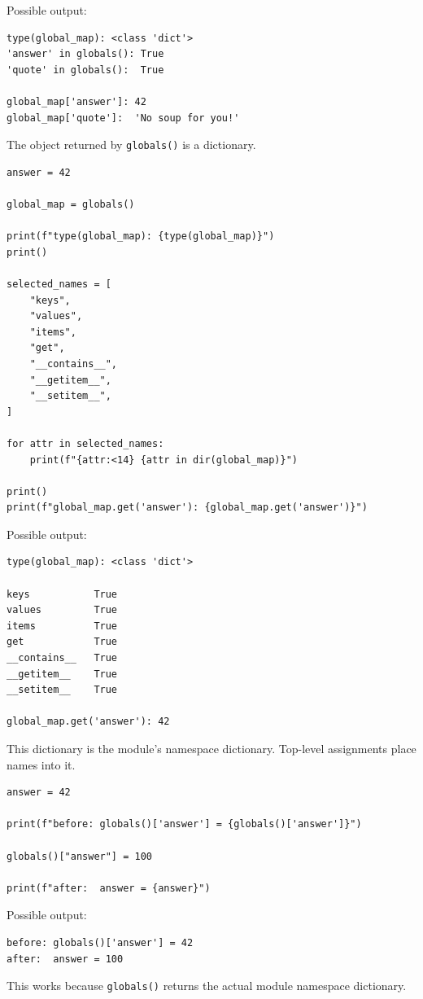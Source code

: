 Possible output:

\begin{verbatim}
type(global_map): <class 'dict'>
'answer' in globals(): True
'quote' in globals():  True

global_map['answer']: 42
global_map['quote']:  'No soup for you!'
\end{verbatim}

The object returned by \texttt{globals()} is a dictionary.

\begin{verbatim}
answer = 42

global_map = globals()

print(f"type(global_map): {type(global_map)}")
print()

selected_names = [
    "keys",
    "values",
    "items",
    "get",
    "__contains__",
    "__getitem__",
    "__setitem__",
]

for attr in selected_names:
    print(f"{attr:<14} {attr in dir(global_map)}")

print()
print(f"global_map.get('answer'): {global_map.get('answer')}")
\end{verbatim}

Possible output:

\begin{verbatim}
type(global_map): <class 'dict'>

keys           True
values         True
items          True
get            True
__contains__   True
__getitem__    True
__setitem__    True

global_map.get('answer'): 42
\end{verbatim}

This dictionary is the module's namespace dictionary. Top-level assignments place names into it.

\begin{verbatim}
answer = 42

print(f"before: globals()['answer'] = {globals()['answer']}")

globals()["answer"] = 100

print(f"after:  answer = {answer}")
\end{verbatim}

Possible output:

\begin{verbatim}
before: globals()['answer'] = 42
after:  answer = 100
\end{verbatim}

This works because \texttt{globals()} returns the actual module namespace dictionary.

